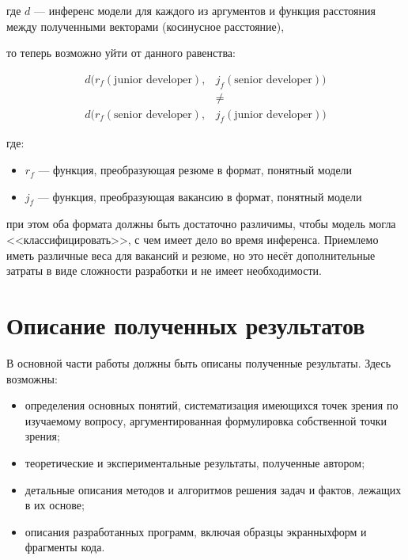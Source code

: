 \documentclass[14pt]{mmcs_article}
\begin{document}
где $d$ --- инференс модели для каждого из аргументов и функция расстояния между полученными векторами (косинусное расстояние),

то теперь возможно уйти от данного равенства:

\begin{equation}
  \label{eq:solved_assymetric_search_problem}
  \begin{aligned}
    d(r_{f}(\text{junior developer}), & j_{f}(\text{senior developer})) \\
                                      & \neq                            \\
    d(r_{f}(\text{senior developer}), & j_{f}(\text{junior developer}))
  \end{aligned}
\end{equation}

где:
\begin{itemize}
  \item $r_{f}$ --- функция, преобразующая резюме в формат, понятный модели
  \item $j_{f}$ --- функция, преобразующая вакансию в формат, понятный модели
\end{itemize}

при этом оба формата должны быть достаточно различимы, чтобы модель могла <<классифицировать>>,  с чем имеет дело во время инференса. Приемлемо иметь различные веса для вакансий и резюме, но это несёт дополнительные затраты в виде сложности разработки и не имеет необходимости.






\newpage
\section{Описание полученных результатов}\label{dsfs}

В основной части работы должны быть описаны полученные результаты. Здесь возможны:
\begin{itemize}
  \item определения основных понятий, систематизация имеющихся точек зрения по изучаемому вопросу, аргументированная формулировка собственной точки зрения;
  \item теоретические и экспериментальные результаты, полученные автором;
  \item детальные описания методов и алгоритмов решения задач и фактов, лежащих в их основе;
  \item описания разработанных программ, включая образцы экранных\linebreak форм и фрагменты кода.
\end{itemize}
\end{document}
